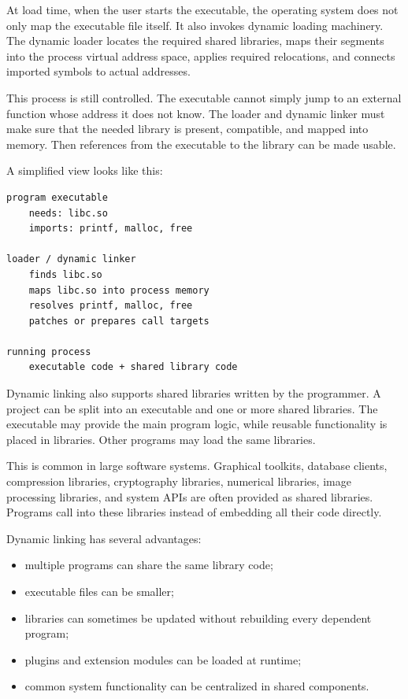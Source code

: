 At load time, when the user starts the executable, the operating system does not only map the executable file itself. It also invokes dynamic loading machinery. The dynamic loader locates the required shared libraries, maps their segments into the process virtual address space, applies required relocations, and connects imported symbols to actual addresses.

This process is still controlled. The executable cannot simply jump to an external function whose address it does not know. The loader and dynamic linker must make sure that the needed library is present, compatible, and mapped into memory. Then references from the executable to the library can be made usable.

A simplified view looks like this:

\begin{verbatim}
program executable
    needs: libc.so
    imports: printf, malloc, free

loader / dynamic linker
    finds libc.so
    maps libc.so into process memory
    resolves printf, malloc, free
    patches or prepares call targets

running process
    executable code + shared library code
\end{verbatim}

Dynamic linking also supports shared libraries written by the programmer. A project can be split into an executable and one or more shared libraries. The executable may provide the main program logic, while reusable functionality is placed in libraries. Other programs may load the same libraries.

This is common in large software systems. Graphical toolkits, database clients, compression libraries, cryptography libraries, numerical libraries, image processing libraries, and system APIs are often provided as shared libraries. Programs call into these libraries instead of embedding all their code directly.

Dynamic linking has several advantages:

\begin{itemize}
    \item multiple programs can share the same library code;
    \item executable files can be smaller;
    \item libraries can sometimes be updated without rebuilding every dependent program;
    \item plugins and extension modules can be loaded at runtime;
    \item common system functionality can be centralized in shared components.
\end{itemize}

